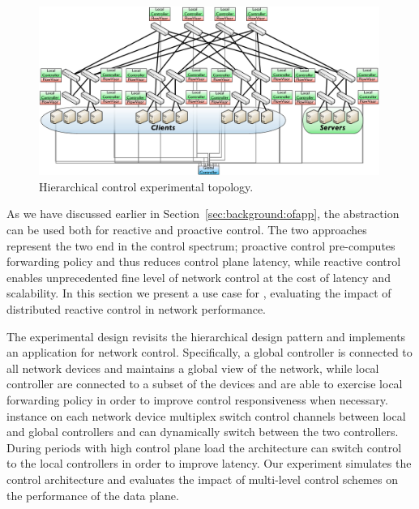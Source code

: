 \begin{figure}[h]
  \begin{center}
    \includegraphics[width=0.99\textwidth]{Chapter1/Chapter1Figs/hierarchy-topology}
  \end{center}
  \caption{Hierarchical control experimental topology.}
  \label{fig:sdnsim-use-case-topology}
\end{figure}

As we have discussed earlier in Section~\ref{sec:background:ofapp}, the \of
abstraction can be used both for reactive and proactive control.  The two
approaches represent the two end in the control spectrum; proactive control
pre-computes forwarding policy and thus reduces control plane latency, while
reactive control enables unprecedented fine level of network control at the cost
of latency and scalability.  In this section we present a use case for \sdnsim,
evaluating the impact of distributed reactive control in network performance. 

The experimental design revisits the hierarchical design pattern and implements
an application for network control. Specifically, a global controller is
connected to all network devices and maintains a global view of the network,
while local controller are connected to a subset of the devices and are able to
exercise local forwarding policy in order to improve control responsiveness when
necessary.  \flv instance on each network device multiplex switch control
channels between local and global controllers and can dynamically switch between
the two controllers.  During periods with high control plane load the
architecture can switch control to the local controllers in order to improve
latency.  Our experiment simulates the control architecture and evaluates the
impact of multi-level control schemes on the performance of the data plane. 

